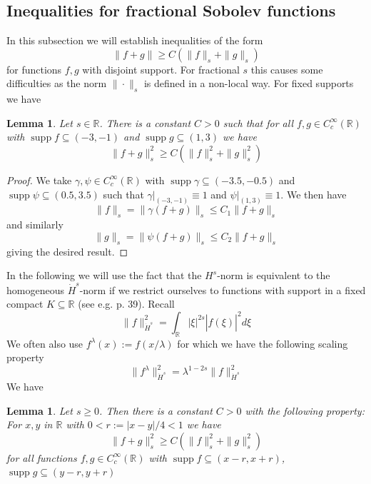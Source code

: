 \documentclass[11pt]{amsart}
\numberwithin{equation}{section}
\newtheorem{lemma}[theorem]{Lemma}
\begin{document}
	


	
	
	
	
	
	
	
	
	
	


\subsection{Inequalities for fractional Sobolev functions}\label{appendix_ineq}
In this subsection we will establish inequalities of the form 
\[
\|f+g\| \geq C (\|f\|_s+\|g\|_s)
\]
for functions $f,g$ with disjoint support. For fractional $s$ this causes some difficulties as the norm $\|\cdot\|_s$ is defined in a non-local way. For fixed supports we have

\begin{lemma}\label{lemma_fixed_supp}
	Let $s \in \mathbb R$. There is a constant $C > 0$ such that for all $f,g \in C^\infty_c(\mathbb R)$ with $\operatorname{supp} f \subseteq (-3,-1)$ and $\operatorname{supp} g \subseteq (1,3)$ we have
	\[
	\|f+g\|_s^2 \geq C (\|f\|_s^2 + \|g\|_s^2)
	\]
\end{lemma} 
\begin{proof}
	We take $\gamma,\psi \in C^\infty_c(\mathbb R)$ with $\operatorname{supp}\gamma \subseteq (-3.5,-0.5)$ and $\operatorname{supp}\psi \subseteq (0.5,3.5)$ such that $\left.\gamma\right|_{(-3,-1)} \equiv 1$ and $\left.\psi\right|_{(1,3)} \equiv 1$. We then have
	\[
	\|f\|_s = \|\gamma (f+g)\|_s \leq C_1 \|f+g\|_s
	\]
	and similarly
	\[
	\|g\|_s = \|\psi (f+g)\|_s \leq C_2 \|f+g\|_s
	\]
	giving the desired result.
\end{proof}

In the following we will use the fact that the $H^s$-norm is equivalent to the homogeneous $\dot H^s$-norm if we restrict ourselves to functions with support in a fixed compact $K \subseteq \mathbb R$ (see e.g. \cite{BahouriCheminDanchin2011} p. 39). Recall
\[
\|f\|_{\dot H^s}^2 = \int_\mathbb R |\xi|^{2s} |\hat f(\xi)|^2 d\xi
\]
We often also use $f^\lambda(x):=f(x/\lambda)$ for which we have the following scaling property
\[
\|f^\lambda\|_{\dot H^s}^2 = \lambda^{1-2s} \|f\|_{\dot H^s}^2 
\]
We have

\begin{lemma}\label{lemma_vanishing_support1}
	Let $s \geq 0$. Then there is a constant $C > 0$ with the following property:
	For $x,y$ in $\mathbb R$ with $0 < r:=|x-y|/4 < 1$  we have
	\[
	\|f+g\|_s^2 \geq C  (\|f\|_s^2 + \|g\|_s^2)
	\]
	for all functions $f,g \in C^\infty_c(\mathbb R)$ with $\operatorname{supp}f \subseteq (x-r,x+r)$, $\operatorname{supp}g \subseteq (y-r,y+r)$
\end{lemma}
\end{document}
